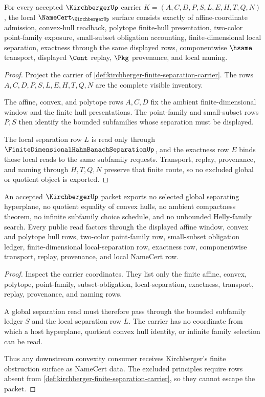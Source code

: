 \begin{theorem}
\label{thm:kirchberger-finite-subset-obligations}
For every accepted $\KirchbergerUp$ carrier $K=(A,C,D,P,S,L,E,H,T,Q,N)$, the local $\NameCert_{\KirchbergerUp}$ surface consists exactly of affine-coordinate admission, convex-hull readback, polytope finite-hull presentation, two-color point-family exposure, small-subset obligation accounting, finite-dimensional local separation, exactness through the same displayed rows, componentwise $\hsame$ transport, displayed $\Cont$ replay, $\Pkg$ provenance, and local naming.
\end{theorem}
\begin{proof}
Project the carrier of \autoref{def:kirchberger-finite-separation-carrier}. The rows $A,C,D,P,S,L,E,H,T,Q,N$ are the complete visible inventory.

The affine, convex, and polytope rows $A,C,D$ fix the ambient finite-dimensional window and the finite hull presentations. The point-family and small-subset rows $P,S$ then identify the bounded subfamilies whose separation must be displayed.

The local separation row $L$ is read only through $\FiniteDimensionalHahnBanachSeparationUp$, and the exactness row $E$ binds those local reads to the same subfamily requests. Transport, replay, provenance, and naming through $H,T,Q,N$ preserve that finite route, so no excluded global or quotient object is exported.
\end{proof}

\begin{theorem}
\label{thm:kirchberger-namecert-nonescape}
An accepted $\KirchbergerUp$ packet exports no selected global separating hyperplane, no quotient equality of convex hulls, no ambient compactness theorem, no infinite subfamily choice schedule, and no unbounded Helly-family search. Every public read factors through the displayed affine window, convex and polytope hull rows, two-color point-family row, small-subset obligation ledger, finite-dimensional local-separation row, exactness row, componentwise transport, replay, provenance, and local NameCert row.
\end{theorem}
\begin{proof}
Inspect the carrier coordinates. They list only the finite affine, convex, polytope, point-family, subset-obligation, local-separation, exactness, transport, replay, provenance, and naming rows.

A global separation read must therefore pass through the bounded subfamily ledger $S$ and the local separation row $L$. The carrier has no coordinate from which a host hyperplane, quotient convex hull identity, or infinite family selection can be read.

Thus any downstream convexity consumer receives Kirchberger's finite obstruction surface as NameCert data. The excluded principles require rows absent from \autoref{def:kirchberger-finite-separation-carrier}, so they cannot escape the packet.
\end{proof}

